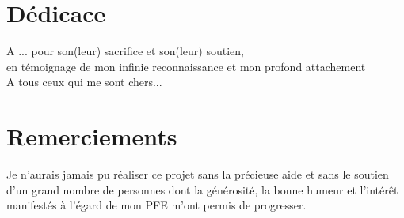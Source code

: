 \documentclass[a4paper, oneside, 12pt, final]{extreport}
\newcommand{\reportAuthor} {%
  FirstName \textsc{LastName}%
}
\newcommand{\juryMemberFour} {%
	M. Ben Foulen \textsc{Fouleni}%
}
\begin{document}

\chapter*{D\'edicace}
\thispagestyle{empty}
%

\begin{center}
{\it 
	
A ... pour son(leur) sacrifice et son(leur) soutien, \\
en témoignage de mon infinie reconnaissance et mon profond attachement \\
\vspace{1cm}
A tous ceux qui me sont chers...

}
\end{center}
%
%

\chapter*{Remerciements}
\thispagestyle{empty}
%

Je n'aurais jamais pu réaliser ce projet sans la précieuse aide et sans le soutien d'un grand nombre de personnes dont la générosité, la bonne humeur et l'intérêt manifestés à l'égard de mon PFE m'ont permis de progresser. \\

\end{document}
